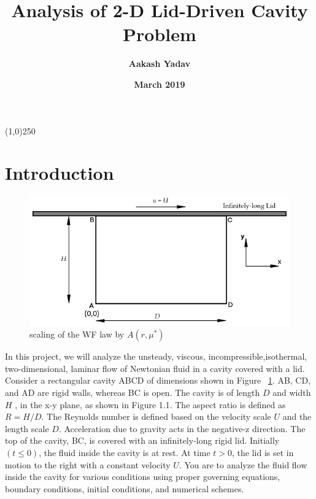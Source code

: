 \documentclass{article}
\title{\textbf{Analysis of 2-D Lid-Driven Cavity Problem}}
\author[1]{\textbf{Aakash Yadav}}
\affil[1]{\textbf{Indian Institute of Technology, Tirupati}}
\date{\textbf{March 2019}}
\begin{document}
\maketitle

\begin{center}
\line(1,0){250}
\end{center}

\section{Introduction}

\begin{figure}[h!]
\centering
\includegraphics[scale=.5]{cavityFig.png}
\caption{scaling of the WF law by $A\left(r,\mu^*\right)$}
\label{fig:cavityFig}
\end{figure}

In this project, we will analyze the unsteady, viscous, incompressible,isothermal, two-dimensional, laminar flow of Newtonian fluid in a cavity covered with a lid. Consider a rectangular cavity ABCD of dimensions shown in Figure ~\ref{fig:cavityFig}. AB, CD, and AD are rigid walls, whereas BC is open. The cavity is of length $D$ and width $H$ , in the x-y plane, as shown in Figure 1.1. The aspect ratio is defined as $R=H/D$. The Reynolds number is defined based on the velocity scale $U$ and the length scale $D$. Acceleration due to gravity acts in the negative-z direction. The top of the cavity, BC, is covered with an infinitely-long rigid lid. Initially $(t \leq 0)$, the fluid inside the cavity is at rest. At time $t > 0$, the lid is set in motion to the right with a constant velocity $U $. You are to analyze the fluid flow inside the cavity for various conditions using proper governing equations, boundary conditions, initial conditions, and numerical schemes.
%
\end{document}
